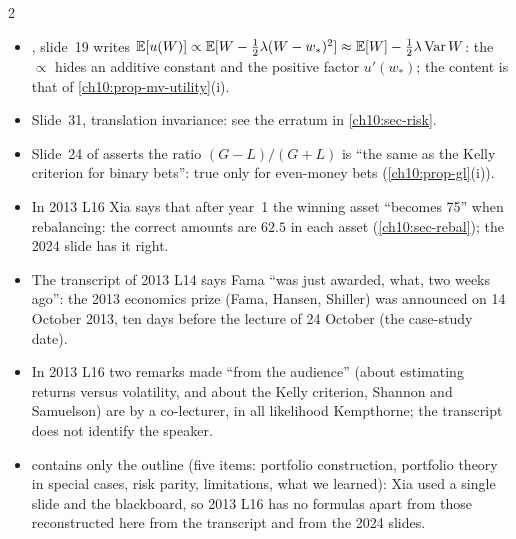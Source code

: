 \begin{paracol}{2}
\begin{coursenote}
\begin{itemize}
  \item {}, slide~19 writes $\mathbb{E}[u(W)]\propto\mathbb{E}[W-\frac12\lambda(W-w_*)^2]\approx\mathbb{E}[W]-\frac12\lambda\operatorname{Var} W$: the
      $\propto$ hides an additive constant and the positive factor $u'(w_*)$; the content is that of \cref{ch10:prop-mv-utility}(i).
  \item Slide~31, translation invariance: see the erratum in \cref{ch10:sec-risk}.
  \item Slide~24 of  asserts the ratio $(G-L)/(G+L)$ is ``the same as
      the Kelly criterion for binary bets'': true only for even-money bets (\cref{ch10:prop-gl}(i)).
  \item In 2013 L16 Xia says that after year~1 the winning
      asset ``becomes 75'' when rebalancing: the correct amounts are $62.5$ in each asset (\cref{ch10:sec-rebal}); the 2024 slide has it right.
  \item The transcript of 2013 L14 says Fama ``was just awarded, what, two weeks ago'': the 2013 economics prize
      (Fama, Hansen, Shiller) was announced on 14 October 2013, ten days before the lecture of 24 October (the case-study date).
  \item In 2013 L16 two remarks made ``from the audience'' (about estimating returns versus volatility, and about the Kelly criterion, Shannon and Samuelson)
      are by a co-lecturer, in all likelihood Kempthorne; the transcript does not identify the speaker.
  \item {} contains only the outline (five items: portfolio construction, portfolio theory in special cases, risk parity, limitations, what we learned): Xia used a single slide and the blackboard, so 2013 L16
      has no formulas apart from those reconstructed here from the transcript and from the 2024 slides.
\end{itemize}
\end{coursenote}


\end{paracol}

